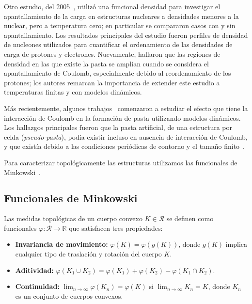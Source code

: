 Otro estudio, del 2005~\cite{maruyama_nuclear_2005}, utilizó una funcional densidad para investigar el apantallamiento de la carga en estructuras nucleares a densidades menores a la nuclear, pero a temperatura cero; en particular se compararon casos con y sin apantallamiento.
Los resultados principales del estudio fueron perfiles de densidad de nucleones utilizados para cuantificar el ordenamiento de las densidades de carga de protones y electrones.
Nuevamente, hallaron que las regiones de densidad en las que existe la pasta se amplían cuando se considera el apantallamiento de Coulomb, especialmente debido al reordenamiento de los protones; los autores remarcan la importancia de extender este estudio a temperaturas finitas y con modelos dinámicos.

Más recientemente, algunos trabajos~\cite{schneider_nuclear_2013,gimenez_molinelli_simulations_2014} comenzaron a estudiar el efecto que tiene la interacción de Coulomb en la formación de pasta utilizando modelos dinámicos.
Los hallazgos principales fueron que la pasta artificial, de una estructura por celda (\emph{pseudo-pasta}), podía existir incluso en ausencia de interacción de Coulomb, y que existía debido a las condiciones periódicas de contorno y el tamaño finito~\cite{binder_beyond_2012}.

Para caracterizar topológicamente las estructuras utilizamos las funcionales de Minkowski~\cite{michielsen_integral-geometry_2001}.

\subsection{Funcionales de Minkowski}

Las medidas topológicas de un cuerpo convexo $K \in \mathcal{R}$ se definen como funcionales $\varphi: \mathcal{R} \rightarrow \mathbb{R}$ que satisfacen tres propiedades:

\begin{itemize}
  \item \textbf{Invariancia de movimiento:} $\varphi(K) = \varphi(g(K))$, donde $g(K)$ implica cualquier tipo de traslación y rotación del cuerpo $K$.
  \item \textbf{Aditividad:} $\varphi(K_1 \cup K_2) = \varphi(K_1) + \varphi(K_2) - \varphi(K_1 \cap K_2)$.
  \item \textbf{Continuidad:} $\lim_{n\rightarrow\infty}\varphi(K_n) = \varphi(K)$ si $\lim_{n\rightarrow\infty}K_n = K$, donde ${K_n}$ es un conjunto de cuerpos convexos.
\end{itemize}

